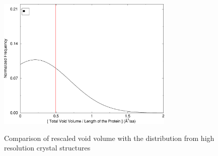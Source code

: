 \documentclass[11pt,twoside,letterpaper]{article}
\begin{document}
\begin{figure}[h!]
	\begin{center}
		\includegraphics[width=0.75\textwidth]{4ins-678-voids.pdf}\\
		\caption{Comparison of rescaled void volume with the distribution from high resolution crystal structures}
	\end{center}
\end{figure}
\end{document}
